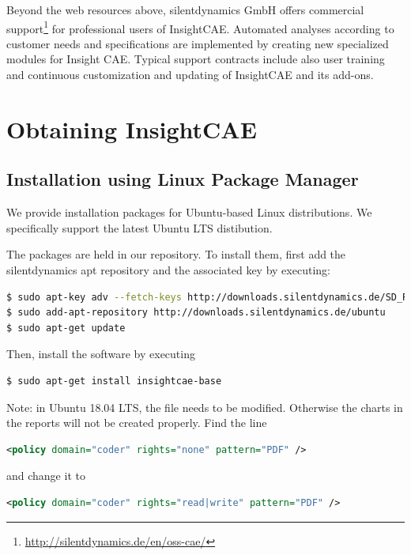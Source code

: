 Beyond the web resources above, silentdynamics GmbH offers commercial support\footnote{\url{http://silentdynamics.de/en/oss-cae/}} for professional users of InsightCAE. Automated analyses according to customer needs and specifications are implemented  by creating new specialized modules for Insight CAE.
Typical support contracts include also user training and continuous customization and updating of InsightCAE and its add-ons.


\section{Obtaining InsightCAE}

\subsection{Installation using Linux Package Manager}

We provide installation packages for Ubuntu-based Linux distributions. We specifically support the latest Ubuntu LTS distibution.

The packages are held in our repository. To install them, first add the silentdynamics apt repository and the associated key by executing:

\begin{lstlisting}[language=bash]
$ sudo apt-key adv --fetch-keys http://downloads.silentdynamics.de/SD_REPOSITORIES_PUBLIC_KEY.gpg
$ sudo add-apt-repository http://downloads.silentdynamics.de/ubuntu
$ sudo apt-get update
\end{lstlisting}

Then, install the software by executing

\begin{lstlisting}[language=bash]
$ sudo apt-get install insightcae-base
\end{lstlisting}


Note:
in Ubuntu 18.04 LTS, the file  needs to be modified. Otherwise the charts in the reports will not be created properly.
Find the line
\begin{lstlisting}[language=xml]
<policy domain="coder" rights="none" pattern="PDF" />
\end{lstlisting}

and change it to
\begin{lstlisting}[language=xml]
<policy domain="coder" rights="read|write" pattern="PDF" />
\end{lstlisting}

